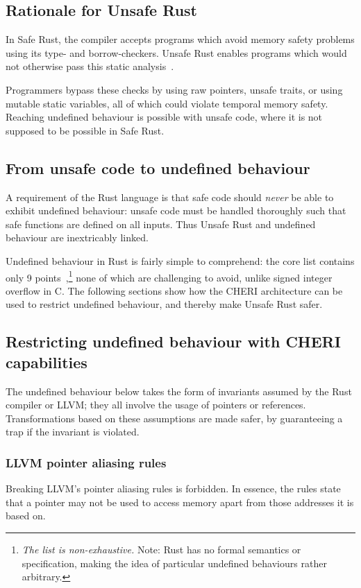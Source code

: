 \documentclass[dissertation.tex]{subfiles}
\begin{document}
\subsection{Rationale for Unsafe Rust}
In Safe Rust, the compiler accepts programs which avoid memory safety
problems using its type- and borrow-checkers.
Unsafe Rust enables programs which would not otherwise pass this static
analysis~\cite{rust-trpl-book}.

Programmers bypass these checks by using raw pointers, unsafe traits, or
using mutable static variables, all of which could violate temporal
memory safety.
Reaching undefined behaviour is possible with unsafe code, where it is
not supposed to be possible in Safe Rust.


\subsection{From unsafe code to undefined behaviour}
A requirement of the Rust language is that safe code should \emph{never}
be able to exhibit undefined behaviour: unsafe code must be handled
thoroughly such that safe functions are defined on all inputs.
Thus Unsafe Rust and undefined behaviour are inextricably linked.

Undefined behaviour in Rust is fairly simple to comprehend:
the core list contains only 9 points~\cite{rust-ref},\footnote{
\emph{The list is non-exhaustive.} Note: Rust has no formal
semantics or specification, making the idea of particular undefined
behaviours rather arbitrary.}
none of which are challenging to avoid, unlike signed integer overflow
in C.
The following sections show how the CHERI architecture can be used to
restrict undefined behaviour, and thereby make Unsafe Rust safer.


\subsection{Restricting undefined behaviour with CHERI capabilities}
\label{sec:eval-betterunsafe-reasons}

The undefined behaviour below takes the form of invariants assumed by
the Rust compiler or LLVM; they all involve the usage of pointers or
references.
Transformations based on these assumptions are made safer, by
guaranteeing a trap if the invariant is violated.

\subsubsection{LLVM pointer aliasing rules}
Breaking LLVM's pointer aliasing rules is forbidden.
In essence, the rules state that a pointer may not be used to access
memory apart from those addresses it is based on.
\end{document}
